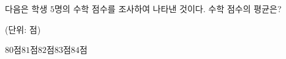 다음은 학생 $5$명의 수학 점수를 조사하여 나타낸 것이다. 수학 점수의 평균은?\par\noindent\hfill{\footnotesize (단위: 점)}
\begin{choices32}{$80$점}{$81$점}{$82$점}{$83$점}{$84$점}\end{choices32}
